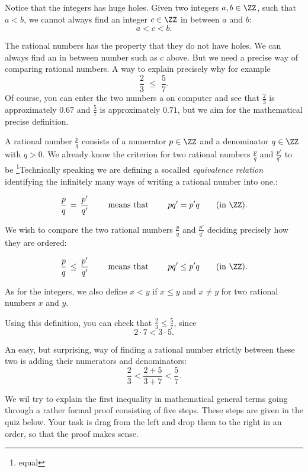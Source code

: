 \documentclass{article}
\begin{document}
Notice that the integers has huge holes. Given two integers $a, b\in \ZZ$, such
that $a < b$, we cannot always find an integer $c\in \ZZ$ in between $a$ and $b$:
$$
a < c < b.
$$

The rational numbers has the property that they do not have holes. We can
always find an in between number such as $c$ above. But we need a precise way
of comparing rational numbers. A way to explain precisely why for example
$$
\frac{2}{3}\,\, \leq \,\, \frac{5}{7}.
$$
Of course, you can enter the two numbers a on computer and see that
$\frac{2}{3}$ is approximately $0.67$ and $\frac{5}{7}$
is approximately $0.71$, but we aim for the mathematical
precise definition.

A
rational number $\frac{p}{q}$ consists of a numerator $p\in \ZZ$ and a denominator
$q\in \ZZ$ with $q > 0$. We already know the criterion for two rational numbers
$\frac{p}{q}$ and $\frac{p'}{q'}$
to be \footnote{equal}{Technically speaking we are defining a socalled \emph{equivalence relation} identifying the infinitely many ways of writing a rational number into one.}:

\begin{equation*}[emph]
\frac{p}{q}\, =\, \frac{p'}{q'}\qquad \text{ means that }\qquad p q' = p' q\qquad (\text{in }\ZZ).
\end{equation*}


We wish to compare the two rational numbers $\frac{p}{q}$ and $\frac{p'}{q'}$ deciding
precisely how they are ordered:

\begin{equation}[emph]
\frac{p}{q}\, \leq\, \frac{p'}{q'}\qquad \text{ means that }\qquad p q' \leq p' q\qquad (\text{in }\ZZ).
\end{equation}


As for the integers, we also define $x < y$ if $x \leq y$ and $x\neq y$ for
two rational numbers $x$ and $y$.

Using this definition, you can check that $\frac{2}{3} \leq \frac{5}{7}$, since
$$
2\cdot 7 < 3 \cdot 5.
$$
 
An easy, but surprising, 
way of finding a rational number strictly between these two is
adding their numerators and denominators:
$$
\frac{2}{3} < \frac{2 + 5}{3 + 7} < \frac{5}{7}.
$$

We wil try to explain the first inequality in mathematical general terms going through a
rather formal proof consisting of five steps. These steps are
given in the quiz below. Your task is drag from the left and drop them to the right in an order, 
so that the proof makes sense. 
\end{document}
